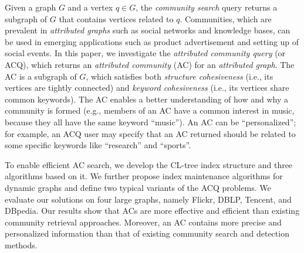 Given a graph $G$ and a vertex $q \in G$, the {\it community search} query returns a subgraph of $G$ that contains vertices related to $q$. Communities, which are prevalent in {\it attributed graphs} such as social networks and knowledge bases, can be used in emerging applications such as product advertisement and setting up of social events.
In this paper, we investigate the {\it attributed community query} (or ACQ), which returns an {\it attributed community} (AC) for an {\it attributed graph}. The AC is a subgraph of $G$, which satisfies both {\it structure cohesiveness} (i.e., its vertices are tightly connected) and {\it keyword cohesiveness} (i.e., its vertices share common keywords).  The AC enables a better understanding of how and why a community is formed (e.g., members of an AC have a common interest in music, because they all have the same keyword ``music'').  An AC can be ``personalized''; for example, an ACQ user may specify that an AC returned should be related to some specific keywords like ``research'' and ``sports''.

To enable efficient AC search, we develop the CL-tree index structure and three algorithms based on it. We further propose index maintenance algorithms for dynamic graphs and define two typical variants of the ACQ problems. We evaluate our solutions on four large graphs, namely Flickr, DBLP, Tencent, and DBpedia. Our results show that ACs are more effective and efficient than existing community retrieval approaches. Moreover, an AC contains more precise and personalized information than that of existing community search and detection methods.


%
%

